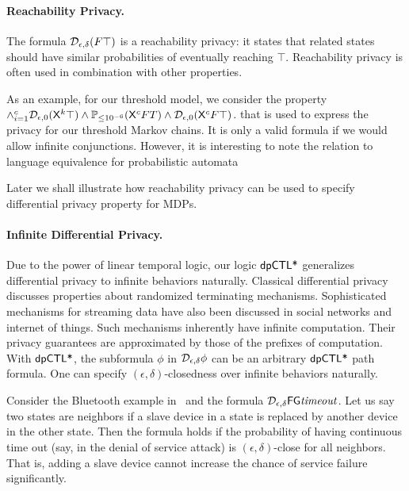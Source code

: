 \paragraph{Reachability Privacy.}
The formula $\mathcal{D}_{{\epsilon}, {\delta}}(F \top)$ is a reachability privacy: it states that related states should have similar probabilities of eventually reaching $\top$. Reachability privacy is often used in combination with other properties.

As an example, for our threshold  model, we consider the property $\wedge_{i=1}^{c} \mathcal{D}_{{\epsilon}, {0}}(\mathsf{X}^k \top) \wedge \mathbb{P}_{\le 10^{-6}}(\mathsf{X}^c F T) \wedge \mathcal{D}_{{\epsilon}, {0}}(\mathsf{X}^c F \top)$.
that is used to express the privacy for our threshold Markov chains. It is only a valid formula if we would allow infinite conjunctions. However, it is interesting to note the relation to language equivalence for probabilistic automata

Later we shall illustrate how reachability privacy can be used to specify differential privacy property for MDPs.

\paragraph{Infinite Differential Privacy.}
Due to the power of linear temporal logic, our logic $\textsf{dpCTL*}$ generalizes differential privacy to infinite
behaviors naturally. Classical differential privacy discusses properties about
randomized terminating mechanisms. Sophisticated mechanisms for
streaming data have also been discussed in social networks and
internet of things. Such mechanisms inherently have infinite
computation. Their privacy guarantees are approximated by those of the
prefixes of computation.
With $\textsf{dpCTL*}$, the subformula $\phi$ in $\mathcal{D}_{{\epsilon}, {\delta}} \phi$
can be an arbitrary $\textsf{dpCTL*}$ path formula. One can specify
$(\epsilon, \delta)$-closedness over infinite behaviors naturally.

Consider the Bluetooth example in~\cite{DKNP04} and the
formula $\mathcal{D}_{{\epsilon}, {\delta}}{\mathsf{F} \mathsf{G} \mathit{timeout}}$. Let us say
two states are neighbors if a slave device in a state is replaced by
another device in the other state.
Then the formula holds if the probability of having
continuous time out (say, in the denial of service attack) is
$(\epsilon, \delta)$-close for all neighbors. That is, adding a slave
device cannot increase the chance of service failure significantly.

